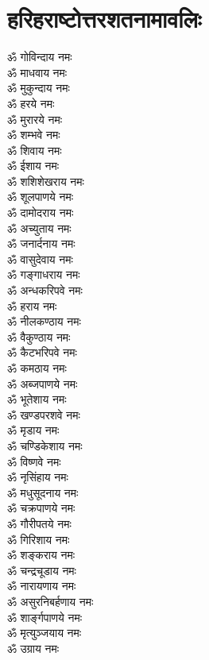 \section{हरिहराष्टोत्तरशतनामावलिः}
\begin{multicols}{2}
\begin{flushleft}
ॐ गोविन्दाय नमः\\
ॐ माधवाय नमः\\
ॐ मुकुन्दाय नमः\\
ॐ हरये नमः\\
ॐ मुरारये नमः\\
ॐ शम्भवे नमः\\
ॐ शिवाय नमः\\
ॐ ईशाय नमः\\
ॐ शशिशेखराय नमः\\
ॐ शूलपाणये नमः\hfill{}\\
ॐ दामोदराय नमः\\
ॐ अच्युताय नमः\\
ॐ जनार्दनाय नमः\\
ॐ वासुदेवाय नमः\\
ॐ गङ्गाधराय नमः\\
ॐ अन्धकरिपवे नमः\\
ॐ हराय नमः\\
ॐ नीलकण्ठाय नमः\\
ॐ वैकुण्ठाय नमः\\
ॐ कैटभरिपवे नमः\hfill{}\\
ॐ कमठाय नमः\\
ॐ अब्जपाणये नमः\\
ॐ भूतेशाय नमः\\
ॐ खण्डपरशवे नमः\\
ॐ मृडाय नमः\\
ॐ चण्डिकेशाय नमः\\
ॐ विष्णवे नमः\\
ॐ नृसिंहाय नमः\\
ॐ मधुसूदनाय नमः\\
ॐ चक्रपाणये नमः\hfill{}\\
ॐ गौरीपतये नमः\\
ॐ गिरिशाय नमः\\
ॐ शङ्कराय नमः\\
ॐ चन्द्रचूडाय नमः\\
ॐ नारायणाय नमः\\
ॐ असुरनिबर्हणाय नमः\\
ॐ शार्ङ्गपाणये नमः\\
ॐ मृत्युञ्जयाय नमः\\
ॐ उग्राय नमः\\

\end{flushleft}
\end{multicols}
